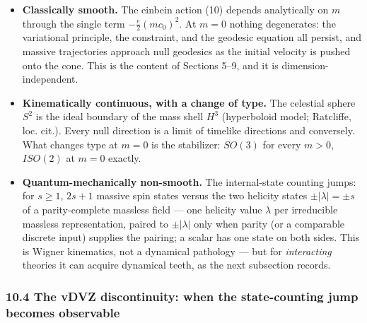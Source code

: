 \documentclass[
]{article}
\providecommand{\tightlist}{%
  \setlength{\itemsep}{0pt}\setlength{\parskip}{0pt}}
\begin{document}
\begin{itemize}
\tightlist
\item
  \textbf{Classically smooth.} The einbein action (10) depends
  analytically on \(m\) through the single term
  \(- \frac{e}{2}(mc_{0})^{2}\). At \(m = 0\) nothing degenerates: the
  variational principle, the constraint, and the geodesic equation all
  persist, and massive trajectories approach null geodesics as the
  initial velocity is pushed onto the cone. This is the content of
  Sections 5--9, and it is dimension-independent.
\item
  \textbf{Kinematically continuous, with a change of type.} The
  celestial sphere \(S^{2}\) is the ideal boundary of the mass shell
  \(H^{3}\) (hyperboloid model; Ratcliffe, loc. cit.). Every null
  direction is a limit of timelike directions and conversely. What
  changes type at \(m = 0\) is the stabilizer: \(SO(3)\) for every
  \(m > 0\), \(ISO(2)\) at \(m = 0\) exactly.
\item
  \textbf{Quantum-mechanically non-smooth.} The internal-state counting
  jumps: for \(s \geq 1\), \(2s + 1\) massive spin states versus the two
  helicity states \(\pm|\lambda| = \pm s\) of a parity-complete massless
  field --- one helicity value \(\lambda\) per irreducible massless
  representation, paired to \(\pm|\lambda|\) only when parity (or a
  comparable discrete input) supplies the pairing; a scalar has one
  state on both sides. This is Wigner kinematics, not a dynamical
  pathology --- but for \emph{interacting} theories it can acquire
  dynamical teeth, as the next subsection records.
\end{itemize}

\hypertarget{the-vdvz-discontinuity-when-the-state-counting-jump-becomes-observable}{%
\subsubsection{10.4 The vDVZ discontinuity: when the state-counting jump
becomes
observable}\label{the-vdvz-discontinuity-when-the-state-counting-jump-becomes-observable}}
\end{document}
